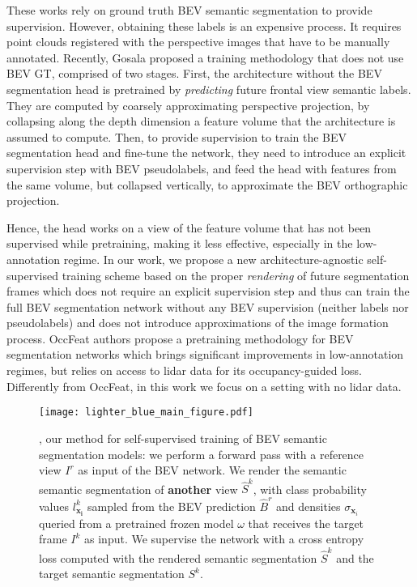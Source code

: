 These works rely on ground truth BEV semantic segmentation to provide supervision. However, obtaining these labels is an expensive process. It requires point clouds registered with the perspective images that have to be manually annotated. Recently, Gosala \etal \cite{gosala_skyeye_2023} proposed a training methodology that does not use BEV GT, comprised of two stages. First, the architecture without the BEV segmentation head is pretrained by \emph{predicting} future frontal view semantic labels. They are computed by coarsely approximating perspective projection, \ie by collapsing along the depth dimension a feature volume that the architecture is assumed to compute. Then, to provide supervision to train the BEV segmentation head and fine-tune the network, they need to introduce an explicit supervision step with BEV pseudolabels, and feed the head with features from the same volume, but collapsed vertically, to approximate the BEV orthographic projection. 

Hence, the head works on a view of the feature volume that has not been supervised while pretraining, making it less effective, especially in the low-annotation regime. In our work, we propose a new architecture-agnostic self-supervised training scheme based on the proper \emph{rendering} of future segmentation frames which does not require an explicit supervision step and thus can train the full BEV segmentation network without any BEV supervision (neither labels nor pseudolabels) and does not introduce approximations of the image formation process.
OccFeat \cite{sirko-galouchenko_occfeat_2024} authors propose a pretraining methodology for BEV segmentation networks which brings significant improvements in low-annotation regimes, but relies on access to lidar data for its occupancy-guided loss. Differently from OccFeat, in this work we focus on a setting with no lidar data.

\begin{figure*}[t]
     \centering
     \texttt{[image: lighter\_blue\_main\_figure.pdf]}
     \caption{\ourmethod, our method for self-supervised training of BEV semantic segmentation models: we perform a forward pass with a reference view $I^r$ as input of the BEV network. We render the semantic semantic segmentation of \textbf{another} view $\hat{S}^k$, with class probability values $l^k_{\mathbf{x_i}}$ sampled from the BEV prediction $\hat{B}^r$ and densities $\sigma_{\mathbf{x}_i}$ queried from a pretrained frozen model $\omega$ that receives the target frame $I^k$ as input. We supervise the network with a cross entropy loss computed with the rendered semantic segmentation $\hat{S}^k$ and the target semantic segmentation $S^k$.}
     \label{fig:main_figure_method}
\end{figure*}

